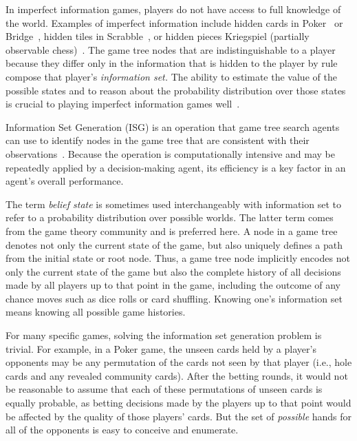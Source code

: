 \documentclass[times, 10pt,twocolumn]{article}
\begin{document}
In imperfect information games, players do not have access to full knowledge of
the world. Examples of imperfect information include hidden cards in
Poker~\cite{billings02challenge} or Bridge~\cite{ginsberg96partition}, hidden
tiles in Scrabble~\cite{richards07opponent}, or hidden pieces 
Kriegspiel (partially observable chess)~\cite{li94chess}. The game tree nodes
that are indistinguishable to a player because they differ only in the
information that is hidden to the player by rule compose that player's {\em
information set.}  The ability to estimate the value of the possible states and
to reason about the probability distribution over those states is crucial to
playing imperfect information games well~\cite{thielscher12hyperplay}. 

Information Set Generation (ISG) is an operation that game tree search agents
can use to identify nodes in the game tree that are consistent with their
observations~\cite{richards12information}.  Because the operation is
computationally intensive and may be repeatedly applied by a decision-making
agent, its efficiency is a key factor in an agent's overall performance.   

The term {\em belief state} is sometimes used interchangeably with information
set to refer to a probability distribution over possible worlds.  The latter
term comes from the game theory community and is preferred here.  A node in a
game tree denotes not only the current state of the game, but also uniquely
defines a path from the initial state or root node.  Thus, a game tree node
implicitly encodes not only the current state of the game but also the complete
history of all decisions made by all players up to that point in the game,
including the outcome of any chance moves such as dice rolls or card shuffling.
Knowing one's information set means knowing all possible game histories.

For many specific games, solving the information set generation problem is
trivial.  For example, in a Poker game, the unseen cards held by a player's
opponents may be any permutation of the cards not seen by that player (i.e.,
hole cards and any revealed community cards).  After the betting rounds, it
would not be reasonable to assume that each of these permutations of unseen
cards is equally probable, as betting decisions made by the players up to that
point would be affected by the quality of those players' cards.  But the set of
{\em possible} hands for all of the opponents is easy to conceive and
enumerate.
\end{document}
